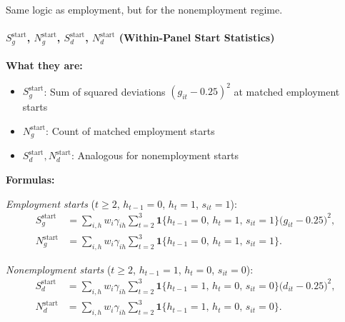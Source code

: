 \documentclass[12pt]{article}
\begin{document}
Same logic as employment, but for the nonemployment regime.

\paragraph{$S_g^{\mathrm{start}}$, $N_g^{\mathrm{start}}$, $S_d^{\mathrm{start}}$, $N_d^{\mathrm{start}}$ (Within-Panel Start Statistics)}

\textbf{What they are:}
\begin{itemize}
\item $S_g^{\mathrm{start}}$: Sum of squared deviations $(g_{it}-0.25)^2$ at matched employment starts
\item $N_g^{\mathrm{start}}$: Count of matched employment starts
\item $S_d^{\mathrm{start}}, N_d^{\mathrm{start}}$: Analogous for nonemployment starts
\end{itemize}

\textbf{Formulas:}

\emph{Employment starts} ($t\ge 2$, $h_{t-1}=0$, $h_t=1$, $s_{it}=1$):
\begin{align*}
S_g^{\mathrm{start}} &= \sum_{i,h} w_i\gamma_{ih}\sum_{t=2}^3\mathbf{1}\{h_{t-1}=0,\,h_t=1,\,s_{it}=1\}\big(g_{it}-0.25\big)^2,\\
N_g^{\mathrm{start}} &= \sum_{i,h} w_i\gamma_{ih}\sum_{t=2}^3\mathbf{1}\{h_{t-1}=0,\,h_t=1,\,s_{it}=1\}.
\end{align*}

\emph{Nonemployment starts} ($t\ge 2$, $h_{t-1}=1$, $h_t=0$, $s_{it}=0$):
\begin{align*}
S_d^{\mathrm{start}} &= \sum_{i,h} w_i\gamma_{ih}\sum_{t=2}^3\mathbf{1}\{h_{t-1}=1,\,h_t=0,\,s_{it}=0\}\big(d_{it}-0.25\big)^2,\\
N_d^{\mathrm{start}} &= \sum_{i,h} w_i\gamma_{ih}\sum_{t=2}^3\mathbf{1}\{h_{t-1}=1,\,h_t=0,\,s_{it}=0\}.
\end{align*}
\end{document}
